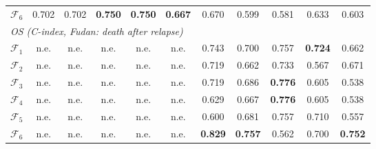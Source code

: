 \documentclass[pdflatex,sn-nature]{sn-jnl}
\begin{document}
\begin{appendices}
\begin{table}[p]
\begin{tabular}{@{}l ccccc ccccc@{}}
$\mathcal{F}_6$ & 0.702 & 0.702 & \textbf{0.750} & \textbf{0.750} & \textbf{0.667} & 0.670 & 0.599 & 0.581 & 0.633 & 0.603 \\
\multicolumn{11}{l}{\textit{OS (C-index, Fudan: death after relapse)}} \\
$\mathcal{F}_1$ & n.e. & n.e. & n.e. & n.e. & n.e. & 0.743 & 0.700 & 0.757 & \textbf{0.724} & 0.662 \\
$\mathcal{F}_2$ & n.e. & n.e. & n.e. & n.e. & n.e. & 0.719 & 0.662 & 0.733 & 0.567 & 0.671 \\
$\mathcal{F}_3$ & n.e. & n.e. & n.e. & n.e. & n.e. & 0.719 & 0.686 & \textbf{0.776} & 0.605 & 0.538 \\
$\mathcal{F}_4$ & n.e. & n.e. & n.e. & n.e. & n.e. & 0.629 & 0.667 & \textbf{0.776} & 0.605 & 0.538 \\
$\mathcal{F}_5$ & n.e. & n.e. & n.e. & n.e. & n.e. & 0.600 & 0.681 & 0.757 & 0.710 & 0.557 \\
$\mathcal{F}_6$ & n.e. & n.e. & n.e. & n.e. & n.e. & \textbf{0.829} & \textbf{0.757} & 0.562 & 0.700 & \textbf{0.752} \\
\bottomrule
\end{tabular}
\end{table}

\clearpage


\end{appendices}
\end{document}

